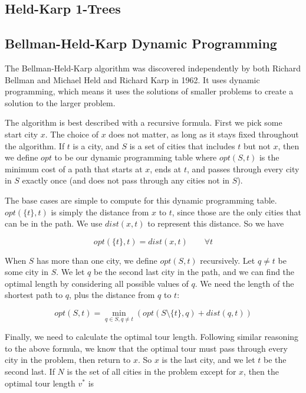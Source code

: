\documentclass[11pt]{article}
\begin{document}
\subsection{Held-Karp 1-Trees}

\subsection{Bellman-Held-Karp Dynamic Programming}

The Bellman-Held-Karp algorithm was discovered independently by both Richard Bellman \cite{Bellman} and Michael Held and Richard Karp \cite{HeldKarp} in 1962. It uses dynamic programming, which means it uses the solutions of smaller problems to create a solution to the larger problem.

The algorithm is best described with a recursive formula. First we pick some start city $x$. The choice of $x$ does not matter, as long as it stays fixed throughout the algorithm. If $t$ is a city, and $S$ is a set of cities that includes $t$ but not $x$, then we define $opt$ to be our dynamic programming table where $opt(S,t)$ is the minimum cost of a path that starts at $x$, ends at $t$, and passes through every city in $S$ exactly once (and does not pass through any cities not in $S$).

The base cases are simple to compute for this dynamic programming table. $opt(\{ t \} , t)$ is simply the distance from $x$ to $t$, since those are the only cities that can be in the path. We use $dist(x,t)$ to represent this distance. So we have

\[ opt(\{ t \}, t) = dist(x,t) \qquad \forall t \]

When $S$ has more than one city, we define $opt(S,t)$ recursively. Let $q \neq t$ be some city in $S$. We let $q$ be the second last city in the path, and we can find the optimal length by considering all possible values of $q$. We need the length of the shortest path to $q$, plus the distance from $q$ to $t$:

\[ opt(S,t) = \min_{q \in S, q \neq t} ( opt(S \setminus \{ t \} , q) + dist(q, t) ) \]

Finally, we need to calculate the optimal tour length. Following similar reasoning to the above formula, we know that the optimal tour must pass through every city in the problem, then return to $x$. So $x$ is the last city, and we let $t$ be the second last. If $N$ is the set of all cities in the problem except for $x$, then the optimal tour length $v^*$ is
\end{document}
